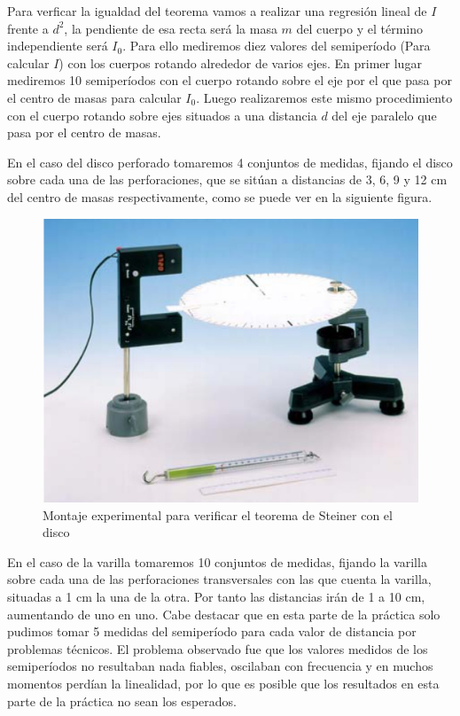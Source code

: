 \documentclass[a4paper,12pt,titlepage]{article}
\begin{document}
\par Para verficar la igualdad del teorema vamos a realizar una regresión lineal de $I$ frente a $d^2$, la pendiente de esa recta será la masa $m$ del cuerpo y el término independiente será $I_0$. Para ello mediremos diez valores del semiperíodo (Para calcular $I$) con los cuerpos rotando alrededor de varios ejes. En primer lugar mediremos 10 semiperíodos con el cuerpo rotando sobre el eje por el que pasa por el centro de masas para calcular $I_0$. Luego realizaremos este mismo procedimiento con el cuerpo rotando sobre ejes situados a una distancia $d$ del eje paralelo que pasa por el centro de masas.

\par En el caso del disco perforado tomaremos 4 conjuntos de medidas, fijando el disco sobre cada una de las perforaciones, que se sitúan a distancias de 3, 6, 9 y 12 cm del centro de masas respectivamente, como se puede ver en la siguiente figura.

\begin{figure}[h!]
    \centering
    \includegraphics[width=0.65\linewidth]{Images/Material MI 2.jpeg}
    \caption{Montaje experimental para verificar el teorema de Steiner con el disco}
\end{figure}

\par En el caso de la varilla tomaremos 10 conjuntos de medidas, fijando la varilla sobre cada una de las perforaciones transversales con las que cuenta la varilla, situadas a 1 cm la una de la otra. Por tanto las distancias irán de 1 a 10 cm, aumentando de uno en uno. Cabe destacar que en esta parte de la práctica solo pudimos tomar 5 medidas del semiperíodo para cada valor de distancia por problemas técnicos. El problema observado fue que los valores medidos de los semiperíodos no resultaban nada fiables, oscilaban con frecuencia y en muchos momentos perdían la linealidad, por lo que es posible que los resultados en esta parte de la práctica no sean los esperados.
\end{document}
